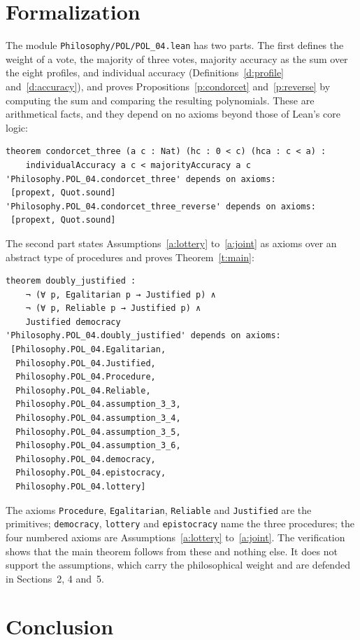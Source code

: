\documentclass{situationist-preprint}
\begin{document}
\section{Formalization}

The module \nolinkurl{Philosophy/POL/POL_04.lean} has two parts. The first defines the weight of a vote, the majority of three votes, majority accuracy as the sum over the eight profiles, and individual accuracy (Definitions~\ref{d:profile} and~\ref{d:accuracy}), and proves Propositions~\ref{p:condorcet} and~\ref{p:reverse} by computing the sum and comparing the resulting polynomials. These are arithmetical facts, and they depend on no axioms beyond those of Lean's core logic:

\begin{lstlisting}
theorem condorcet_three (a c : Nat) (hc : 0 < c) (hca : c < a) :
    individualAccuracy a c < majorityAccuracy a c
'Philosophy.POL_04.condorcet_three' depends on axioms:
 [propext, Quot.sound]
'Philosophy.POL_04.condorcet_three_reverse' depends on axioms:
 [propext, Quot.sound]
\end{lstlisting}

The second part states Assumptions~\ref{a:lottery} to~\ref{a:joint} as axioms over an abstract type of procedures and proves Theorem~\ref{t:main}:

\begin{lstlisting}
theorem doubly_justified :
    ¬ (∀ p, Egalitarian p → Justified p) ∧
    ¬ (∀ p, Reliable p → Justified p) ∧
    Justified democracy
'Philosophy.POL_04.doubly_justified' depends on axioms:
 [Philosophy.POL_04.Egalitarian,
  Philosophy.POL_04.Justified,
  Philosophy.POL_04.Procedure,
  Philosophy.POL_04.Reliable,
  Philosophy.POL_04.assumption_3_3,
  Philosophy.POL_04.assumption_3_4,
  Philosophy.POL_04.assumption_3_5,
  Philosophy.POL_04.assumption_3_6,
  Philosophy.POL_04.democracy,
  Philosophy.POL_04.epistocracy,
  Philosophy.POL_04.lottery]
\end{lstlisting}

The axioms \texttt{Procedure}, \texttt{Egalitarian}, \texttt{Reliable} and \texttt{Justified} are the primitives; \texttt{democracy}, \texttt{lottery} and \texttt{epistocracy} name the three procedures; the four numbered axioms are Assumptions~\ref{a:lottery} to~\ref{a:joint}. The verification shows that the main theorem follows from these and nothing else. It does not support the assumptions, which carry the philosophical weight and are defended in Sections~2, 4 and~5.

\section{Conclusion}
\end{document}
